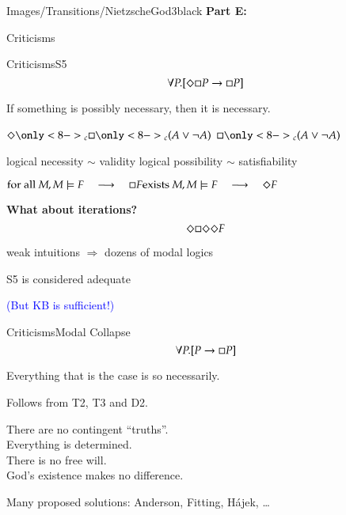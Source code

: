 \begin{transitionframe}{Images/Transitions/NietzscheGod3}{black}
\textbf{Part E:}

Criticisms
\end{transitionframe}

\begin{frame}{Criticisms}{S5} \centering
$$
\forall P.[ \Diamond \Box P \rightarrow \Box P ] 
$$

\medskip

If something is possibly necessary, then it is necessary.

\pause

\bigskip


$
\pos\only<8->{_c} \nec\only<8->{_c} (A \vee \neg A)
$
\pause
\qquad 
$
\nec\only<8->{_c} (A \vee \neg A)
$

\pause

\bigskip

logical necessity $\sim$ validity
\hfill
logical possibility $\sim$ satisfiability

\pause 

\medskip

$ 
\textrm{for all } M, M \models F 
\quad \longrightarrow \quad
\nec F
\hfill
\textrm{exists } M, M \models F 
\quad \longrightarrow \quad
\pos F
$

\pause

\bigskip

\textbf{What about iterations?}
$$
\Diamond \Box \Diamond \Diamond F
$$

\medskip

\pause

weak intuitions $\Rightarrow$ dozens of modal logics

\medskip

\pause

\alert{S5 is considered adequate}

\medskip

\pause

\textcolor{blue}{(But KB is sufficient!)}


\end{frame}


\begin{frame}{Criticisms}{Modal Collapse} \centering
$$
\forall P.[ P \rightarrow \Box P ] 
$$

\medskip

Everything that is the case is so necessarily.

\pause

\medskip

Follows from T2, T3 and D2.

\pause

\medskip

There are no contingent ``truths''. \\ \pause
Everything is determined. \\ \pause
There is no free will. \\ \pause
God's existence makes no difference.

\pause
\bigskip

Many proposed solutions: Anderson, Fitting, H\'ajek, \ldots
 
\end{frame}



